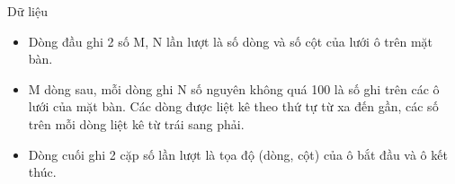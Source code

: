 Dữ liệu  
\begin{itemize}
	\item     Dòng đầu ghi 2 số M, N lần lượt là số dòng và số cột của lưới ô trên mặt bàn.   
	\item     M dòng sau, mỗi dòng ghi N số nguyên không quá 100 là số ghi trên các ô lưới của mặt bàn. Các dòng được liệt kê theo thứ tự từ xa đến gần, các số trên mỗi dòng liệt kê từ trái sang phải.   
	\item     Dòng cuối ghi 2 cặp số lần lượt là tọa độ (dòng, cột) của ô bắt đầu và ô kết thúc.   
\end{itemize}